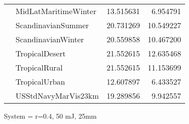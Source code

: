 \begin{tabular}{llrr}
             & MidLatMaritimeWinter &  13.515631 &   6.954791 \\
             & ScandinavianSummer &  20.731269 &  10.549227 \\
             & ScandinavianWinter &  20.559858 &  10.467200 \\
             & TropicalDesert &  21.552615 &  12.635468 \\
             & TropicalRural &  21.552615 &  11.153699 \\
             & TropicalUrban &  12.607897 &   6.433527 \\
             & USStdNavyMarVis23km &  19.289856 &   9.942557 \\
\bottomrule
\end{tabular}


\clearpage
System = r=0.4, 50 mJ, 25mm


